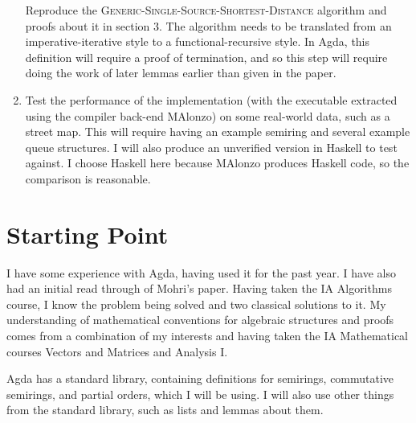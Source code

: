 \begin{enumerate}
    Reproduce the \textsc{Generic-Single-Source-Shortest-Distance} algorithm and proofs about it in section 3.
    The algorithm needs to be translated from an imperative-iterative style to a functional-recursive style.
    In Agda, this definition will require a proof of termination, and so this step will require doing the work of later lemmas earlier than given in the paper.
  \item
    Test the performance of the implementation (with the executable extracted using the compiler back-end MAlonzo) on some real-world data, such as a street map.
    This will require having an example semiring and several example queue structures.
    I will also produce an unverified version in Haskell to test against.
    I choose Haskell here because MAlonzo produces Haskell code, so the comparison is reasonable.
\end{enumerate}

\section*{Starting Point}
I have some experience with Agda, having used it for the past year.
I have also had an initial read through of Mohri's paper.
Having taken the IA Algorithms course, I know the problem being solved and two classical solutions to it.
My understanding of mathematical conventions for algebraic structures and proofs comes from a combination of my interests and having taken the IA Mathematical courses Vectors and Matrices and Analysis I.

Agda has a standard library, containing definitions for semirings, commutative semirings, and partial orders, which I will be using.
I will also use other things from the standard library, such as lists and lemmas about them.


